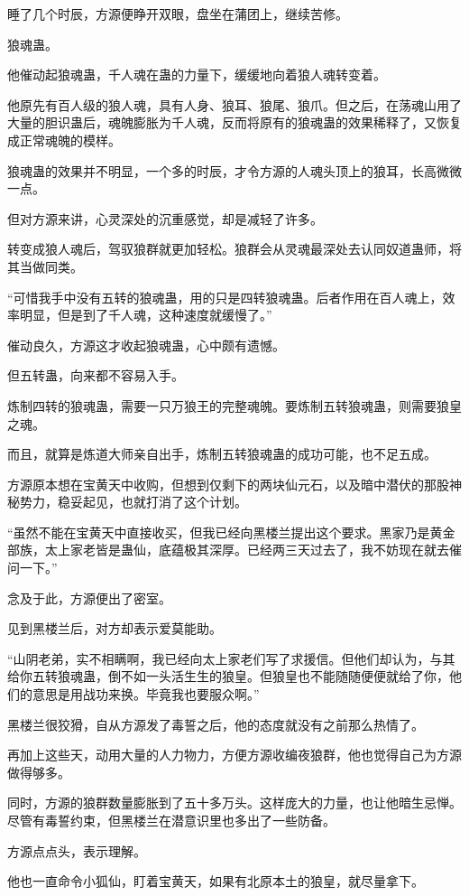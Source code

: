 \begin{this_body}
睡了几个时辰，方源便睁开双眼，盘坐在蒲团上，继续苦修。

狼魂蛊。

他催动起狼魂蛊，千人魂在蛊的力量下，缓缓地向着狼人魂转变着。

他原先有百人级的狼人魂，具有人身、狼耳、狼尾、狼爪。但之后，在荡魂山用了大量的胆识蛊后，魂魄膨胀为千人魂，反而将原有的狼魂蛊的效果稀释了，又恢复成正常魂魄的模样。

狼魂蛊的效果并不明显，一个多的时辰，才令方源的人魂头顶上的狼耳，长高微微一点。

但对方源来讲，心灵深处的沉重感觉，却是减轻了许多。

转变成狼人魂后，驾驭狼群就更加轻松。狼群会从灵魂最深处去认同奴道蛊师，将其当做同类。

“可惜我手中没有五转的狼魂蛊，用的只是四转狼魂蛊。后者作用在百人魂上，效率明显，但是到了千人魂，这种速度就缓慢了。”

催动良久，方源这才收起狼魂蛊，心中颇有遗憾。

但五转蛊，向来都不容易入手。

炼制四转的狼魂蛊，需要一只万狼王的完整魂魄。要炼制五转狼魂蛊，则需要狼皇之魂。

而且，就算是炼道大师亲自出手，炼制五转狼魂蛊的成功可能，也不足五成。

方源原本想在宝黄天中收购，但想到仅剩下的两块仙元石，以及暗中潜伏的那股神秘势力，稳妥起见，也就打消了这个计划。

“虽然不能在宝黄天中直接收买，但我已经向黑楼兰提出这个要求。黑家乃是黄金部族，太上家老皆是蛊仙，底蕴极其深厚。已经两三天过去了，我不妨现在就去催问一下。”

念及于此，方源便出了密室。

见到黑楼兰后，对方却表示爱莫能助。

“山阴老弟，实不相瞒啊，我已经向太上家老们写了求援信。但他们却认为，与其给你五转狼魂蛊，倒不如一头活生生的狼皇。但狼皇也不能随随便便就给了你，他们的意思是用战功来换。毕竟我也要服众啊。”

黑楼兰很狡猾，自从方源发了毒誓之后，他的态度就没有之前那么热情了。

再加上这些天，动用大量的人力物力，方便方源收编夜狼群，他也觉得自己为方源做得够多。

同时，方源的狼群数量膨胀到了五十多万头。这样庞大的力量，也让他暗生忌惮。尽管有毒誓约束，但黑楼兰在潜意识里也多出了一些防备。

方源点点头，表示理解。

他也一直命令小狐仙，盯着宝黄天，如果有北原本土的狼皇，就尽量拿下。


\end{this_body}
